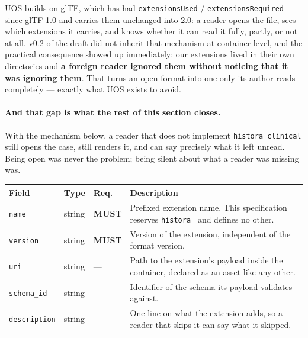\documentclass[11pt,a4paper]{article}
\newcommand{\MUST}{\textcolor{uosred}{\textbf{MUST}}}
\newcommand{\code}[1]{\texttt{\small #1}}
\begin{document}
UOS builds on glTF, which has had \code{extensionsUsed} / \code{extensionsRequired} since
glTF 1.0 and carries them unchanged into 2.0: a reader opens the file, sees which extensions it carries, and
knows whether it can read it fully, partly, or not at all. v0.2 of the draft did not
inherit that mechanism at container level, and the practical consequence showed up
immediately: our extensions lived in their own directories and \textbf{a foreign reader
ignored them without noticing that it was ignoring them}. That turns an open format into
one only its author reads completely --- exactly what UOS exists to avoid.

\paragraph{And that gap is what the rest of this section closes.} With the mechanism
below, a reader that does not implement \code{histora\_clinical} still opens the case, still
renders it, and can say precisely what it left unread. Being open was never the problem;
being silent about what a reader was missing was.

\begin{longtable}{L{3.5cm} L{3.0cm} C{1.4cm} L{6.4cm}}
\toprule
\textbf{Field} & \textbf{Type} & \textbf{Req.} & \textbf{Description}\\
\midrule
\endhead
\code{name} & string & \MUST{} & Prefixed extension name. This specification reserves \code{histora\_} and defines no other.\\
\code{version} & string & \MUST{} & Version of the extension, independent of the format version.\\
\code{uri} & string & --- & Path to the extension's payload inside the container, declared as an asset like any other.\\
\code{schema\_id} & string & --- & Identifier of the schema its payload validates against.\\
\code{description} & string & --- & One line on what the extension adds, so a reader that skips it can say what it skipped.\\
\bottomrule
\end{longtable}
\end{document}
